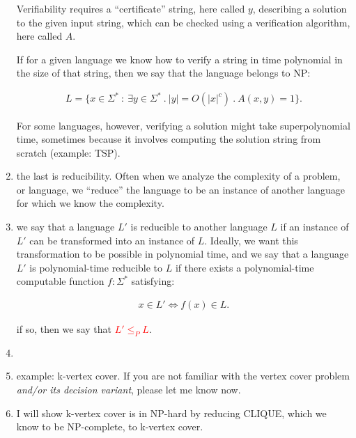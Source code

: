 \begin{enumerate}
    Verifiability requires a ``certificate'' string, here called $y$, describing
    a solution to the given input string, which can be checked using a
    verification algorithm, here called $A$.

    If for a given language we know how to verify a string in time polynomial
    in the size of that string, then we say that the language belongs to NP:
      \begin{textred}
      \begin{align}
        L = \{x \in \Sigma^\ast\ :\ \exists y  \in \Sigma^\ast \ . \ |y| =
        O(|x|^c) \ .\  A(x, y) = 1\}.
      \end{align}
      \end{textred}
    For some languages, however, verifying a solution might take superpolynomial
    time, sometimes because it involves computing the solution string from
    scratch (example: TSP).

  \item the last is reducibility. Often when we analyze the complexity of a
    problem, or language, we ``reduce'' the language to be an instance of
    another language for which we know the complexity.

  \item we say that a language $L'$ is reducible to another language $L$ if an
    instance of $L'$ can be transformed into an instance of $L$. Ideally, we
    want this transformation to be possible in polynomial time, and we say that
    a language $L'$ is polynomial-time reducible to $L$ if there exists a
    polynomial-time computable function $f : \Sigma^\ast$ satisfying:

    \begin{textred}
    \begin{align}
       x \in L' \iff f(x) \in L.
    \end{align}
    \end{textred}

    if so, then we say that \textcolor{red}{$L' \leq_P L$}.

  \item {}

  \item example: k-vertex cover. If you are not familiar with the vertex cover
    problem \emph{and/or its decision variant}, please let me know now.

  \item I will show k-vertex cover is in NP-hard by reducing CLIQUE, which we know
    to be NP-complete, to k-vertex cover.


\end{enumerate}
